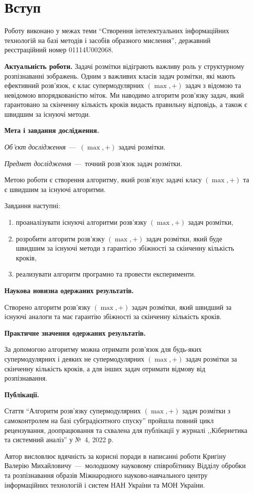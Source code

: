 \chapter*{Вступ}

Роботу виконано у межах теми ``Створення інтелектуальних інформаційних
технологій на базі методів і засобів образного мислення'',
державний реєстраційний номер 01114U002068.

\textbf{Актуальність роботи.}
Задачі розмітки відіграють важливу роль у структурному розпізнаванні
зображень. Одним з важливих класів задач
розмітки, які мають ефективний розв’язок, є клас супермодулярних
\((\max,+)\) задач з відомою  та невідомою впорядкованістю міток.
Ми наводимо алгоритм розв'язку задач, який гарантовано за скінченну кількість
кроків видасть правильну відповідь, а також є швидшим за існуючі методи.

\textbf{Мета і завдання дослідження.}

\textit{Об'єкт дослідження}~---~\((\max,+)\) задачі розмітки.

\textit{Предмет дослідження}~---~точний розв’язок задач розмітки.

Метою роботи є створення алгоритму, який розв'язує задачі класу
\((\max,+)\) та є швидшим за існуючі алгоритми.

Завдання наступні:
\begin{enumerate}
  \item
    проаналізувати існуючі алгоритми розв'язку \((\max,+)\) задач розмітки,
  \item
    розробити алгоритм розв'язку \((\max,+)\) задач розмітки, який буде
    швидшим за існуючі методи з гарантією збіжності за скінченну
    кількість кроків,
  \item
    реализувати алгоритм програмно та провести експерименти.
\end{enumerate}

\textbf{Наукова новизна одержаних результатів.}

Створено алгоритм розв'язку \((\max,+)\) задач розмітки, який швидший за
існуючі аналоги та має гарантію збіжності за скінченну кількість кроків.

\textbf{Практичне значення одержаних результатів.}

За допомогою алгоритму можна отримати розв'язок для будь-яких
супермодулярних і деяких не супермодулярних \((\max,+)\) задач розмітки
за скінченну кількість кроків,
а для інших задач отримати відмову від розпізнавання.

\textbf{Публікації.}

Стаття ``Алгоритм розв'язку супермодулярних $(\max, +)$ задач
розмітки з самоконтролем на базі субградієнтного спуску''
пройшла повний цикл рецензування, доопрацювання та схвалена для
публікації у журналі
,,Кібернетика та системний аналіз'' у № 4, 2022 р.

Автор висловлює вдячність за корисні поради в написанні роботи Кригіну Валерію Михайловичу~---~молодшому
науковому співробітнику Відділу обробки та розпізнавання
образів Міжнародного науково-навчального центру інформаційних
технологій і систем НАН України та МОН України.